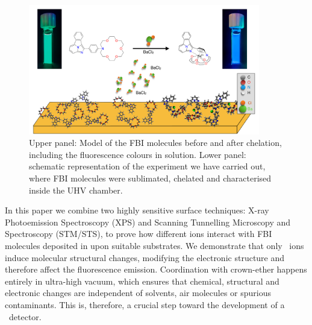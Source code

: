 \documentclass[aps,prl,reprint,longbibliography,superscriptaddress, english]{revtex4-1}
\begin{document}
 
 \begin{figure}[ht!]
	\includegraphics[width=0.9\textwidth]{figures/fig1_fbi_model.pdf}
	\caption{\label{ModeloFBI} 
    Upper panel: Model of the FBI molecules before and after chelation, including the fluorescence colours in solution. Lower panel: schematic representation of the experiment we have carried out, where FBI molecules were sublimated, chelated and characterised inside the UHV chamber.}
\end{figure}  

In this paper we combine two highly sensitive surface techniques: X-ray Photoemission Spectroscopy (XPS) and Scanning Tunnelling Microscopy and Spectroscopy (STM/STS), to prove how different ions interact with FBI molecules deposited in upon suitable substrates. We demonstrate that only \Bapp\ ions induce molecular structural changes, modifying the electronic structure and therefore affect the fluorescence emission. Coordination with crown-ether happens entirely in ultra-high vacuum, which ensures that chemical, structural and electronic changes are independent of solvents, air molecules or spurious contaminants. This is, therefore, a crucial step toward the development of a \Bapp\ detector. 
\end{document}
